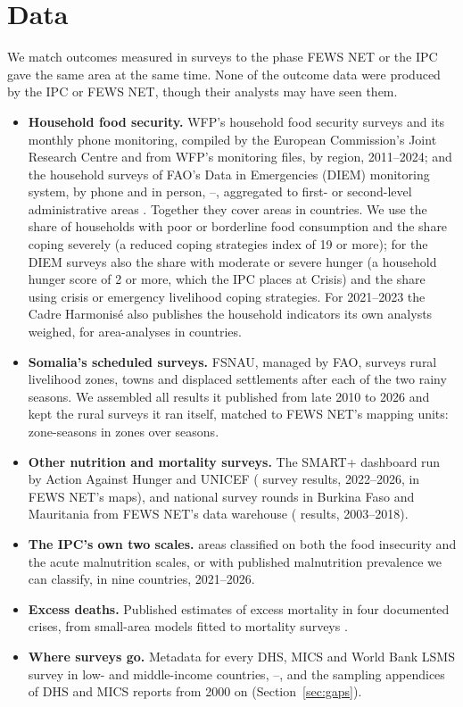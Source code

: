 \documentclass[11pt]{article}
\begin{document}
\section{Data}\label{sec:data}

We match outcomes measured in surveys to the phase FEWS NET or the IPC gave the same area at the same time. None of the outcome data were produced by the IPC or FEWS NET, though their analysts may have seen them.
\begin{itemize}
  \item \textbf{Household food security.} WFP's household food security surveys and its monthly phone monitoring, compiled by the European Commission's Joint Research Centre \citep{machefer2025hfid} and from WFP's monitoring files, by region, 2011--2024; and the household surveys of FAO's Data in Emergencies (DIEM) monitoring system, by phone and in person, \dmYearZero{}--\dmYearOne{}, aggregated to first- or second-level administrative areas \citep{fao2026diem}. Together they cover \fsFoodAreas{} areas in \fsFoodCountries{} countries. We use the share of households with poor or borderline food consumption and the share coping severely (a reduced coping strategies index of 19 or more); for the DIEM surveys also the share with moderate or severe hunger (a household hunger score of 2 or more, which the IPC places at Crisis) and the share using crisis or emergency livelihood coping strategies. For 2021--2023 the Cadre Harmonis\'e also publishes the household indicators its own analysts weighed, for \chN{} area-analyses in \chCountries{} countries.
  \item \textbf{Somalia's scheduled surveys.} FSNAU, managed by FAO, surveys rural livelihood zones, towns and displaced settlements after each of the two rainy seasons. We assembled all \fsAll{} results it published from late 2010 to 2026 and kept the rural surveys it ran itself, matched to FEWS NET's mapping units: \fsN{} zone-seasons in \fsZones{} zones over \fsSeasons{} seasons.
  \item \textbf{Other nutrition and mortality surveys.} The SMART+ dashboard run by Action Against Hunger and UNICEF (\spN{} survey results, 2022--2026, \spNfews{} in FEWS NET's maps), and national survey rounds in Burkina Faso and Mauritania from FEWS NET's data warehouse (\fdwN{} results, 2003--2018).
  \item \textbf{The IPC's own two scales.} \amnAnyN{} areas classified on both the food insecurity and the acute malnutrition scales, or with published malnutrition prevalence we can classify, in nine countries, 2021--2026.
  \item \textbf{Excess deaths.} Published estimates of excess mortality in four documented crises, from small-area models fitted to mortality surveys \citep{checchi2013,warsame2023,lshtm2023somalia,checchi2023nigeria}.
  \item \textbf{Where surveys go.} Metadata for every DHS, MICS and World Bank LSMS survey in \gapCountries{} low- and middle-income countries, \gapYearZero{}--\gapYearOne{}, and the sampling appendices of \exReports{} DHS and MICS reports from 2000 on (Section~\ref{sec:gaps}).
\end{itemize}
\end{document}
